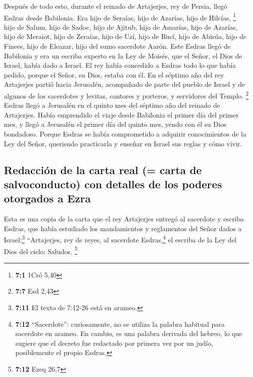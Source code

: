  Después de todo esto, durante el reinado de Artajerjes,
rey de Persia, llegó Esdras desde Babilonia. Era hijo de Seraías, hijo
de Azarías, hijo de Hilcías, \footnote{\textbf{7:1} 1Cró 5,40}
 hijo de Salum, hijo de Sadoc, hijo de Ajitub,
 hijo de Amarías, hijo de Azarías, hijo de Meraiot,
 hijo de Zeraías, hijo de Uzí, hijo de Bucí,
 hijo de Abisúa, hijo de Finees, hijo de Eleazar, hijo del
sumo sacerdote Aarón.  Este Esdras llegó de Babilonia y
era un escriba experto en la Ley de Moisés, que el Señor, el Dios de
Israel, había dado a Israel. El rey había concedido a Esdras todo lo que
había pedido, porque el Señor, su Dios, estaba con él.  En
el séptimo año del rey Artajerjes partió hacia Jerusalén, acompañado de
parte del pueblo de Israel y de algunos de los sacerdotes y levitas,
cantores y porteros, y servidores del Templo. \footnote{\textbf{7:7} Esd
  2,43}  Esdras llegó a Jerusalén en el quinto mes del
séptimo año del reinado de Artajerjes.  Había emprendido
el viaje desde Babilonia el primer día del primer mes, y llegó a
Jerusalén el primer día del quinto mes, yendo con él su Dios bondadoso.
 Porque Esdras se había comprometido a adquirir
conocimientos de la Ley del Señor, queriendo practicarla y enseñar en
Israel sus reglas y cómo vivir.

\hypertarget{redacciuxf3n-de-la-carta-real-carta-de-salvoconducto-con-detalles-de-los-poderes-otorgados-a-ezra}{%
\subsection{Redacción de la carta real (= carta de salvoconducto) con
detalles de los poderes otorgados a
Ezra}\label{redacciuxf3n-de-la-carta-real-carta-de-salvoconducto-con-detalles-de-los-poderes-otorgados-a-ezra}}

 Esta es una copia de la carta que el rey Artajerjes
entregó al sacerdote y escriba Esdras, que había estudiado los
mandamientos y reglamentos del Señor dados a Israel:\footnote{\textbf{7:11}
  El texto de 7:12-26 está en arameo.}  ``Artajerjes, rey
de reyes, al sacerdote Esdras,\footnote{\textbf{7:12} ``Sacerdote'':
  curiosamente, no se utiliza la palabra habitual para sacerdote en
  arameo. En cambio, es una palabra derivada del hebreo, lo que sugiere
  que el decreto fue redactado por primera vez por un judío,
  posiblemente el propio Esdras.} el escriba de la Ley del Dios del
cielo: Saludos. \footnote{\textbf{7:12} Ezeq 26,7}


